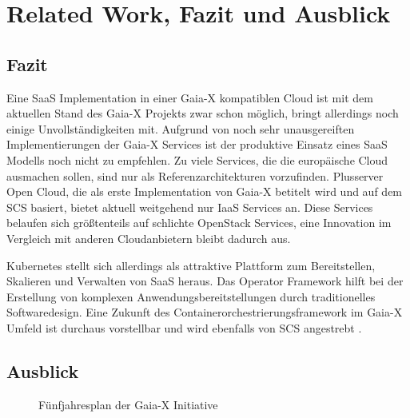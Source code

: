 \chapter{Related Work, Fazit und Ausblick}
\label{chapter:fazit}



\section{Fazit}
\label{sec:fazit_ausblick:fazit}

Eine \ac{SaaS} Implementation in einer Gaia-X kompatiblen Cloud ist mit dem aktuellen Stand des Gaia-X Projekts zwar schon 
möglich, bringt allerdings noch einige Unvollständigkeiten mit.
Aufgrund von noch sehr unausgereiften Implementierungen der Gaia-X Services ist der produktive Einsatz eines \ac{SaaS}
Modells noch nicht zu empfehlen. 
Zu viele Services, die die europäische Cloud ausmachen sollen, sind nur als Referenzarchitekturen vorzufinden.
Plusserver Open Cloud, die als erste Implementation von Gaia-X betitelt wird und auf dem \acf{SCS} basiert, 
bietet aktuell weitgehend nur \ac{IaaS} Services an.
Diese Services belaufen sich größtenteils auf schlichte OpenStack Services, 
eine Innovation im Vergleich mit anderen Cloudanbietern bleibt dadurch aus.

Kubernetes stellt sich allerdings als attraktive Plattform zum Bereitstellen, Skalieren und Verwalten von \acf{SaaS} heraus.
Das Operator Framework hilft bei der Erstellung von komplexen Anwendungsbereitstellungen durch traditionelles Softwaredesign.
Eine Zukunft des Containerorchestrierungsframework im Gaia-X Umfeld ist durchaus vorstellbar und wird ebenfalls von \ac{SCS}
angestrebt \cite{scs}.

\newpage
\section{Ausblick}
\label{sec:fazit_ausblick:ausblick}

\begin{figure}[h]
  \centering
  \caption{Fünfjahresplan der Gaia-X Initiative}
  \label{fig:gaia-x-ausblick}
\end{figure}

